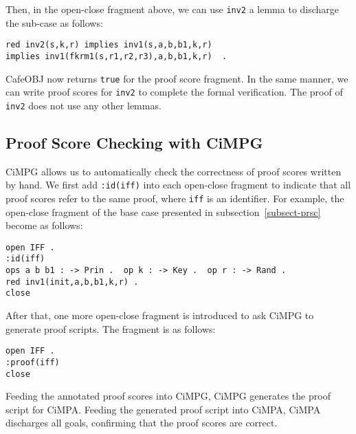 \documentclass[a4paper,fleqn]{cas-dc}
\begin{document}
\noindent
Then, in the open-close fragment above, we can use \verb!inv2! a lemma to discharge the sub-case as follows:

\begin{small}
	\begin{verbatim}
red inv2(s,k,r) implies inv1(s,a,b,b1,k,r) 
implies inv1(fkrm1(s,r1,r2,r3),a,b,b1,k,r)  .
	\end{verbatim}
\end{small}

\noindent
CafeOBJ now returns \verb!true! for the proof score fragment.
In the same manner, we can write proof scores for \verb!inv2! to complete the formal verification.
The proof of \verb!inv2! does not use any other lemmas.


\subsection{Proof Score Checking with CiMPG} \label{cimpg}
CiMPG allows us to automatically check the correctness of proof scores written by hand.
We first add \verb!:id(iff)! into each open-close fragment to indicate that all proof scores refer to the same proof, where \verb!iff! is an identifier.
For example, the open-close fragment of the base case presented in subsection~\ref{subsect-prsc} become as follows:

\begin{small}
	\begin{verbatim}
open IFF .
:id(iff)
ops a b b1 : -> Prin .  op k : -> Key .  op r : -> Rand .
red inv1(init,a,b,b1,k,r) .
close
	\end{verbatim}
\end{small}

\noindent
 After that, one more open-close fragment is introduced to ask CiMPG to generate proof scripts. The fragment is as follows:

 \begin{small}
\begin{verbatim}
open IFF .
:proof(iff)
close
\end{verbatim}
 \end{small}

 \noindent
Feeding the annotated proof scores into CiMPG, CiMPG generates the proof script for CiMPA. 
Feeding the generated proof script into CiMPA, CiMPA discharges all goals, confirming that the proof scores are correct.

\end{document}
